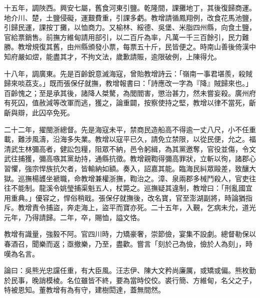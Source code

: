\begin{pinyinscope}
十五年，調陜西。興安七屬，舊食河東引鹽。乾隆間，課攤地丁，其後復歸商運。地介川、楚，土鹽侵礙，運艱費重，引課多虧。教增請循鳳翔例，改食花馬池鹽，引歸民運，課按丁攤，以恤商力。又榆林、綏德、吳堡、米脂四州縣，向食土鹽，官給票銷售。前撫方維甸請用部引，以二百斤為率，凡萬一千三百餘引，民力難勝。教增規復其舊，由州縣頒發小票，每票五十斤，民皆便之。時南山善後倚漢中知府嚴如熤，能盡其才，不拘文法，歲歉請賑，逾限破例，上陳得允。

十八年，調廣東。先是百齡銳意滅海寇，曾貽教增詩云：「嶺南一事君堪羨，殺賊歸來啖荔支。」既而張保仔就撫，教增報書曰：「詩應改一字為『降』賊歸來也。」百齡愧之；至是承其後，諸降人桀驁，為閭閻害，懲治甚力，然未嘗妄殺。廣州府有死囚，值赦減等改軍而逃，獲之，論重闢，按察使持之堅，教增以律不當死，齗齗與辯，此囚卒免死。

二十二年，擢閩浙總督。先是海寇未平，禁商民造船高不得逾一丈八尺，小不任重載，難涉風濤，沿海多失業。教增以寇平已久，請免立禁限，以從民便，允之。福清武生林彌高者，健訟包糧，阻眾不納，邑令躬緝，為其黨邀奪，官役並傷，令文武往捕獲，彌高嗾其黨劫持，通縣抗徵。教增親鞫得彌高罪狀，立斬以徇，諸郡心習懼，強宗悍族抗欠者，皆輸納如額。奏入，詔嘉其能。臨海民糾眾毆差，致釀大獄。巡撫楊頀坐褫職，命教增兼權浙撫，鞫治之。漳、泉兩郡多械鬥殺人，官吏往往不能制。龍溪令姚瑩捕渠魁五人，杖斃之。巡撫疑其違制，教增曰：「刑亂國宜用重典。」優容之，悍俗稍戢。張保仔就撫後，改名寶，官至澎湖副將，時論猶指斥。教增責令捕盜，奔走海上，盜平而寶亦死。二十五年，入覲，乞病未允，道光元年，乃得請歸。二年，卒，賜恤，謚文恪。

教增有識量，強毅不阿。官四川時，力矯豪奢，崇節儉，宴集不設劇。總督勒保以春酒召，聞樂而返；亟撤樂，乃至，盡歡。嘗言「刻於己為儉，儉於人為刻」，時嘆為名言。

論曰：吳熊光忠讜任重，有大臣風。汪志伊、陳大文矜尚廉厲，或矯或偏。熊枚勤於民事，晚誚模棱。名位雖皆不終，要為當時佼佼。裘行簡、方維甸，名父之子，特被恩知。董教增有為有守，建樹閎達，蓋無間然。


\end{pinyinscope}